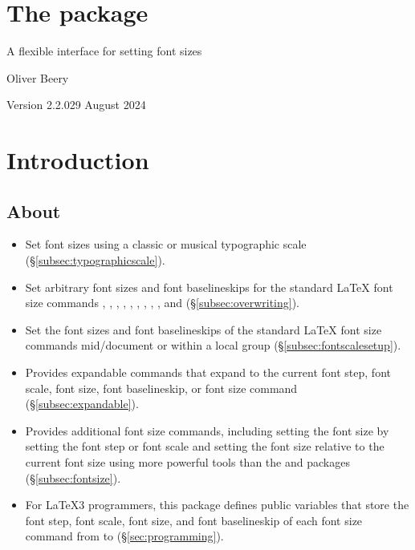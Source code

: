 \documentclass{beery}
\begin{document}
\section*
  {%
    The  package%
  }

A flexible interface for setting font sizes

Oliver Beery

Version 2.2.0\quad{}29 August 2024


\section{Introduction}
\label{sec:intro}

\subsection{About}
\label{subsec:about}

\begin{itemize}
  \item
  Set font sizes using a classic or musical typographic scale (\S\ref{subsec:typographicscale}).
  \item
  Set arbitrary font sizes and font baselineskips for the standard \LaTeX{} font size commands , , , , , , , , , and  (\S\ref{subsec:overwriting}).
  \item
  Set the font sizes and font baselineskips of the standard \LaTeX{} font size commands mid\-/document or within a local group (\S\ref{subsec:fontscalesetup}).
  \item
  Provides expandable commands that expand to the current font step, font scale, font size, font baselineskip, or font size command (\S\ref{subsec:expandable}).
  \item
  Provides additional font size commands, including setting the font size by setting the font step or font scale and setting the font size relative to the current font size using more powerful tools than the  and  packages (\S\ref{subsec:fontsize}).
  \item
  For \LaTeX3 programmers, this package defines public  variables that store the font step, font scale, font size, and font baselineskip of each font size command from  to  (\S\ref{sec:programming}).
\end{itemize}
\end{document}
